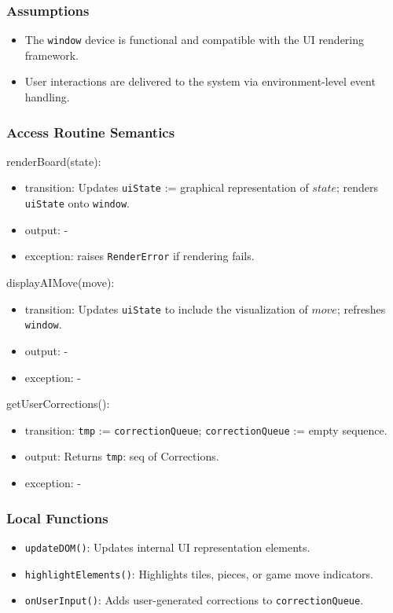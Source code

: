 \documentclass[12pt, titlepage]{article}
\begin{document}
\subsubsection{Assumptions}
\begin{itemize}
    \item The \texttt{window} device is functional and compatible with the UI rendering framework.
    \item User interactions are delivered to the system via environment-level event handling.
\end{itemize}

\subsubsection{Access Routine Semantics}

\noindent renderBoard(state):
\begin{itemize}
\item transition: Updates \texttt{uiState} := graphical representation of $state$;
      renders \texttt{uiState} onto \texttt{window}.
\item output: -
\item exception: raises \texttt{RenderError} if rendering fails.
\end{itemize}

\noindent displayAIMove(move):
\begin{itemize}
\item transition: Updates \texttt{uiState} to include the visualization of $move$;
      refreshes \texttt{window}.
\item output: -
\item exception: -
\end{itemize}

\noindent getUserCorrections():
\begin{itemize}
\item transition: \texttt{tmp} := \texttt{correctionQueue};
      \texttt{correctionQueue} := empty sequence.
\item output: Returns \texttt{tmp}: seq of Corrections.
\item exception: -
\end{itemize}

\subsubsection{Local Functions}
\begin{itemize}
\item \texttt{updateDOM()}: Updates internal UI representation elements.
\item \texttt{highlightElements()}: Highlights tiles, pieces, or game move indicators.
\item \texttt{onUserInput()}: Adds user-generated corrections to \texttt{correctionQueue}.
\end{itemize}
\end{document}
